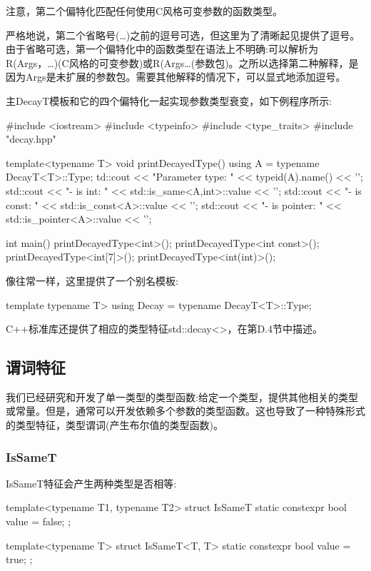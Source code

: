 注意，第二个偏特化匹配任何使用C风格可变参数的函数类型。

\begin{notice}严格地说，第二个省略号(…)之前的逗号可选，但这里为了清晰起见提供了逗号。由于省略可选，第一个偏特化中的函数类型在语法上不明确:可以解析为R(Args，…)(C风格的可变参数)或R(Args…(参数包)。之所以选择第二种解释，是因为Args是未扩展的参数包。需要其他解释的情况下，可以显式地添加逗号。
\end{notice}

主DecayT模板和它的四个偏特化一起实现参数类型衰变，如下例程序所示:

\begin{cpp}
#include <iostream>
#include <typeinfo>
#include <type_traits>
#include "decay.hpp"

template<typename T>
void printDecayedType()
{
	using A = typename DecayT<T>::Type;
	td::cout << "Parameter type: " << typeid(A).name() << ’\n’;
	std::cout << "- is int: " << std::is_same<A,int>::value << ’\n’;
	std::cout << "- is const: " << std::is_const<A>::value << ’\n’;
	std::cout << "- is pointer: " << std::is_pointer<A>::value << ’\n’;
}

int main()
{
	printDecayedType<int>();
	printDecayedType<int const>();
	printDecayedType<int[7]>();
	printDecayedType<int(int)>();
}
\end{cpp}

像往常一样，这里提供了一个别名模板:

\begin{cpp}
template typename T>
using Decay = typename DecayT<T>::Type;
\end{cpp}

C++标准库还提供了相应的类型特征std::decay<>，在第D.4节中描述。

\subsection{谓词特征}

我们已经研究和开发了单一类型的类型函数:给定一个类型，提供其他相关的类型或常量。但是，通常可以开发依赖多个参数的类型函数。这也导致了一种特殊形式的类型特征，类型谓词(产生布尔值的类型函数)。

\subsubsection{IsSameT}

IsSameT特征会产生两种类型是否相等:

\begin{cpp}
template<typename T1, typename T2>
struct IsSameT {
	static constexpr bool value = false;
};

template<typename T>
struct IsSameT<T, T> {
	static constexpr bool value = true;
};
\end{cpp}

